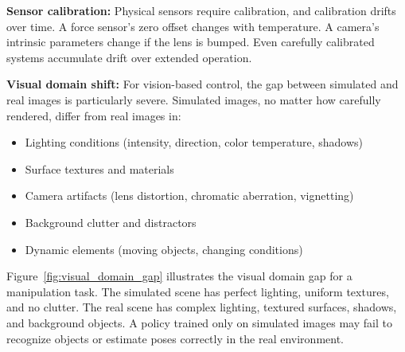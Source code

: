 \textbf{Sensor calibration:} Physical sensors require calibration, and calibration drifts over time. A force sensor's zero offset changes with temperature. A camera's intrinsic parameters change if the lens is bumped. Even carefully calibrated systems accumulate drift over extended operation.

\textbf{Visual domain shift:} For vision-based control, the gap between simulated and real images is particularly severe. Simulated images, no matter how carefully rendered, differ from real images in:
\begin{itemize}
    \item Lighting conditions (intensity, direction, color temperature, shadows)
    \item Surface textures and materials
    \item Camera artifacts (lens distortion, chromatic aberration, vignetting)
    \item Background clutter and distractors
    \item Dynamic elements (moving objects, changing conditions)
\end{itemize}

Figure~\ref{fig:visual_domain_gap} illustrates the visual domain gap for a manipulation task. The simulated scene has perfect lighting, uniform textures, and no clutter. The real scene has complex lighting, textured surfaces, shadows, and background objects. A policy trained only on simulated images may fail to recognize objects or estimate poses correctly in the real environment.

